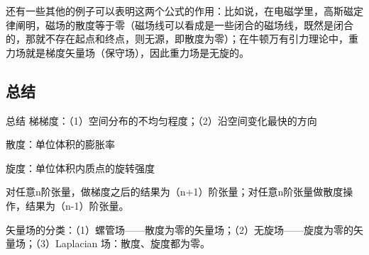 \documentclass{ctexart}
\begin{document}
\par
 还有一些其他的例子可以表明这两个公式的作用：比如说，在电磁学里，高斯磁定律阐明，磁场的散度等于零（磁场线可以看成是一些闭合的磁场线，既然是闭合的，那就不存在起点和终点，则无源，即散度为零）；在牛顿万有引力理论中，重力场就是梯度矢量场（保守场），因此重力场是无旋的。


\subsection{总结}
\begin{结论}{总结}
      梯梯度：（1）空间分布的不均匀程度；（2）沿空间变化最快的方向
      \par
      散度：单位体积的膨胀率
      \par
      旋度：单位体积内质点的旋转强度
      \par
      对任意n阶张量，做梯度之后的结果为（n+1）阶张量；对任意n阶张量做散度操作，结果为（n-1）阶张量。
      \par
      矢量场的分类：（1）螺管场——散度为零的矢量场；（2）无旋场——旋度为零的矢量场；（3）Laplacian 场：散度、旋度都为零。
\end{结论}
\end{document}
